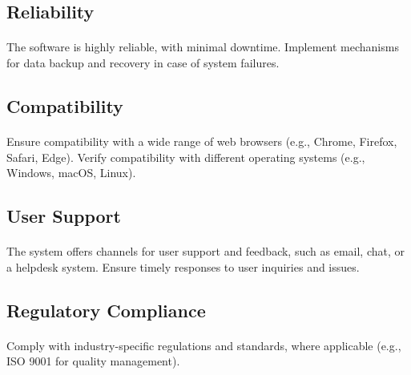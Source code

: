 \documentclass{article}
\begin{document}
\subsection{Reliability}
\paragraph{}
The software is highly reliable, with minimal downtime.
Implement mechanisms for data backup and recovery in case of system failures.

\subsection{Compatibility}
\paragraph{}
Ensure compatibility with a wide range of web browsers (e.g., Chrome, Firefox, Safari, Edge).
Verify compatibility with different operating systems (e.g., Windows, macOS, Linux).


\subsection{User Support}
\paragraph{}
The system offers channels for user support and feedback, such as email, chat, or a helpdesk system.
Ensure timely responses to user inquiries and issues.

\subsection{Regulatory Compliance}
\paragraph{}
Comply with industry-specific regulations and standards, where applicable (e.g., ISO 9001 for quality management).
\end{document}
